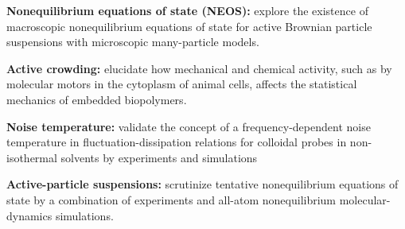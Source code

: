 \begin{workpackage}[id=WPactive,wphases=0-48,
  short=Active Particle Suspensions,%
  title=Probing active particle suspensions with colloids and polymers,
  lead=ULEI,
  ULEIRM=96,UNIPDRM=6,USTUTTRM=2]

\newrefsection

\begin{wpobjectives}
  \begin{compactitem}

  \item \textbf{Nonequilibrium equations of state (NEOS):} explore the existence of
  macroscopic nonequilibrium equations of state for active Brownian particle suspensions
  with microscopic many-particle models.
  \item \textbf{Active crowding:} elucidate how mechanical
  and chemical activity, such as by molecular motors in the cytoplasm of animal cells,
  affects the statistical mechanics of embedded biopolymers.
  \item \textbf{Noise temperature:} validate the concept of a frequency-dependent noise
  temperature in fluctuation-dissipation relations for colloidal probes 
  in non-isothermal solvents by experiments and simulations
  \item \textbf{Active-particle suspensions:} scrutinize tentative nonequilibrium equations
  of state by a combination of experiments and all-atom nonequilibrium molecular-dynamics
  simulations.
  \end{compactitem}
\end{wpobjectives}


\end{workpackage}
